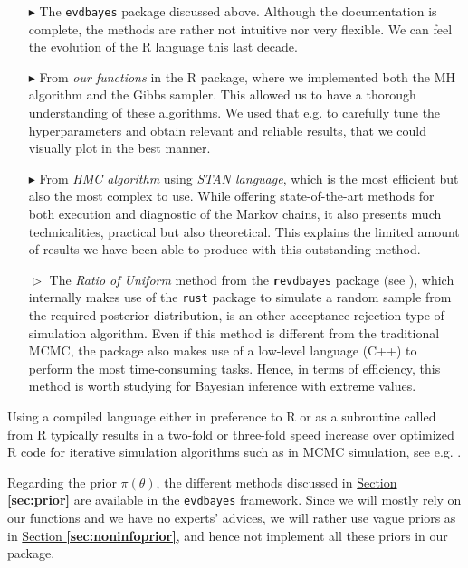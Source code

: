  \begin{itemize}
 	\item[$\blacktriangleright$] The \texttt{evdbayes} package discussed above. Although the documentation is complete, the methods are rather not intuitive nor very flexible. We can feel the evolution of the R language this last decade.
 	
 	\item[$\blacktriangleright$] From \emph{our functions} in the R package, where we implemented both the MH algorithm and the Gibbs sampler. This allowed us to have a thorough understanding of these algorithms. We used that e.g. to carefully tune the hyperparameters and obtain relevant and reliable results, that we could visually plot in the best manner.
 	
 	\item[$\blacktriangleright$] From \emph{HMC algorithm} using \emph{STAN language}, which is the most efficient but also the most complex to use. While offering state-of-the-art methods for both execution and diagnostic of the Markov chains, it also presents much technicalities, practical but also theoretical. This explains the limited amount of results we have been able to produce with this outstanding method.
 	 	
 	 \item[$\vartriangleright$] The \emph{Ratio of Uniform} method from the \texttt{\textbf{r}evdbayes} package (see \citet{northrop_2017_revd}), which internally makes use of the \texttt{rust} package to simulate a random sample from the required posterior distribution,  is an other acceptance-rejection type of simulation algorithm.
   Even if this method is different from the traditional MCMC, the package also makes use of a low-level language (C++) to perform the most time-consuming tasks. Hence, in terms of efficiency, this method is worth studying for Bayesian inference with extreme values.   
 \end{itemize}
 Using a compiled language either in preference to R or as a subroutine called from R typically results in a two-fold or three-fold
 speed increase over optimized R code for iterative simulation algorithms such as in MCMC simulation, see e.g. \citet{stan_development_team_stan_2012}.

Regarding the prior $\pi(\theta)$, the different methods discussed in \hyperref[sec:prior]{Section \textbf{\ref{sec:prior}}} are available in the \texttt{evdbayes} framework. Since we will mostly rely on our functions and we have no experts' advices, we will rather use vague priors as in \hyperref[sec:noninfoprior]{Section \textbf{\ref{sec:noninfoprior}}}, and hence not implement all these priors in our package. 

